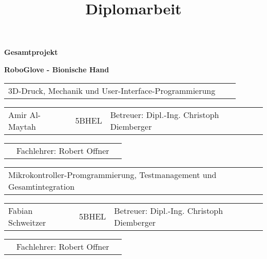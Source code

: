 \documentclass[11pt]{article}
\begin{document}


\begin{titlepage}
	
	\title{\textbf{\Huge{Diplomarbeit}}}
	\maketitle
	\thispagestyle{empty}

	\begin{center}

		\hfill \break
		\hfill \break
		\hfill \break
		\textbf{\Large{Gesamtprojekt}} \break
		\par
		\textbf{\LARGE{RoboGlove - Bionische Hand}}

		\hfill \break
		\hfill \break
		\hfill \break
		\hfill \break
		\hfill \break

		\begin{tabular}{p{10cm}p{1cm}l}
			3D-Druck, Mechanik und User-Interface-Programmierung \\
		\end{tabular}

		\begin{tabular}{p{3cm}p{2cm}l}
			Amir Al-Maytah & 5BHEL & Betreuer: Dipl.-Ing. Christoph Diemberger \\
		\end{tabular}

		\begin{tabular}{p{3.26cm}p{5cm}l}
			& Fachlehrer: Robert Offner 
		\end{tabular}

		\hfill \break

		\begin{tabular}{p{14cm}p{1cm}l}
			Mikrokontroller-Promgrammierung, Testmanagement und Gesamtintegration \\
		\end{tabular}

		\begin{tabular}{p{3cm}p{2cm}l}
			Fabian Schweitzer & 5BHEL & Betreuer: Dipl.-Ing. Christoph Diemberger \\
		\end{tabular}

		\begin{tabular}{p{3.26cm}p{5cm}l}
			& Fachlehrer: Robert Offner 
		\end{tabular}


\end{center}
\end{titlepage}
\end{document}
